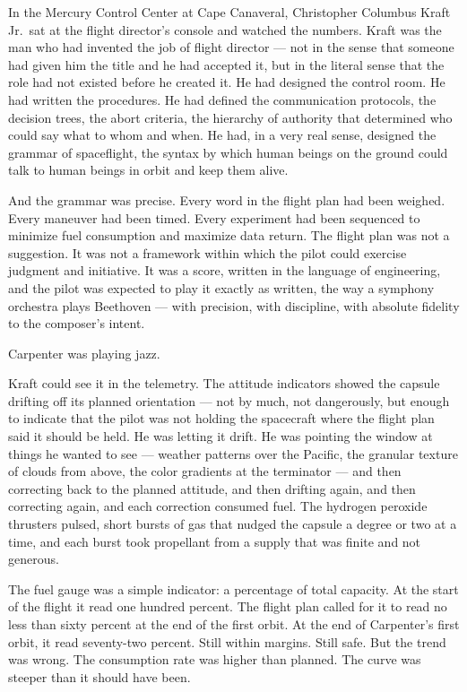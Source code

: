 \documentclass[12pt, letterpaper]{article}
\begin{document}
\vspace{1em}

In the Mercury Control Center at Cape Canaveral, Christopher Columbus Kraft Jr.\ sat at the flight director's console and watched the numbers. Kraft was the man who had invented the job of flight director --- not in the sense that someone had given him the title and he had accepted it, but in the literal sense that the role had not existed before he created it. He had designed the control room. He had written the procedures. He had defined the communication protocols, the decision trees, the abort criteria, the hierarchy of authority that determined who could say what to whom and when. He had, in a very real sense, designed the grammar of spaceflight, the syntax by which human beings on the ground could talk to human beings in orbit and keep them alive.

And the grammar was precise. Every word in the flight plan had been weighed. Every maneuver had been timed. Every experiment had been sequenced to minimize fuel consumption and maximize data return. The flight plan was not a suggestion. It was not a framework within which the pilot could exercise judgment and initiative. It was a score, written in the language of engineering, and the pilot was expected to play it exactly as written, the way a symphony orchestra plays Beethoven --- with precision, with discipline, with absolute fidelity to the composer's intent.

Carpenter was playing jazz.

Kraft could see it in the telemetry. The attitude indicators showed the capsule drifting off its planned orientation --- not by much, not dangerously, but enough to indicate that the pilot was not holding the spacecraft where the flight plan said it should be held. He was letting it drift. He was pointing the window at things he wanted to see --- weather patterns over the Pacific, the granular texture of clouds from above, the color gradients at the terminator --- and then correcting back to the planned attitude, and then drifting again, and then correcting again, and each correction consumed fuel. The hydrogen peroxide thrusters pulsed, short bursts of gas that nudged the capsule a degree or two at a time, and each burst took propellant from a supply that was finite and not generous.

The fuel gauge was a simple indicator: a percentage of total capacity. At the start of the flight it read one hundred percent. The flight plan called for it to read no less than sixty percent at the end of the first orbit. At the end of Carpenter's first orbit, it read seventy-two percent. Still within margins. Still safe. But the trend was wrong. The consumption rate was higher than planned. The curve was steeper than it should have been.
\end{document}

